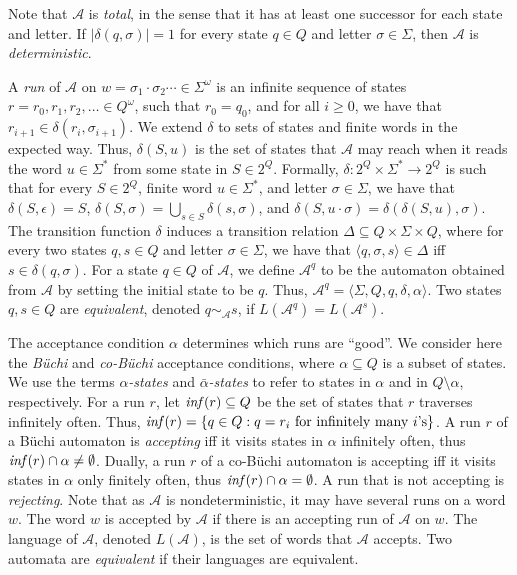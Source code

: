 \documentclass[10pt,a4paper]{amsart}
\theoremstyle{definition}
\numberwithin{equation}{section}
\newcommand{\buchi}{B\"uchi\xspace}
\newcommand{\A}{{\mathcal A}}
\begin{document}
Note that $\A$ is \emph{total}, in the sense that it has at least one successor for each state and letter.
If $|\delta(q, \sigma)| = 1$ for every state $q\in Q$ and letter $\sigma \in \Sigma$, then $\A$ is \emph{deterministic}.


A \emph{run}  of $\A$ on $w = \sigma_1 \cdot \sigma_2 \cdots \in \Sigma^\omega$ is an infinite sequence of states $r = r_0,r_1,r_2,\ldots \in Q^\omega$, such that $r_0 = q_0$, and for all $i \geq 0$, we have that $r_{i+1} \in \delta(r_i, \sigma_{i+1})$. 
We extend $\delta$ to sets of states and finite words in the expected way. Thus, $\delta(S, u)$ is the set of states that $\A$ may reach when it reads the word $u \in \Sigma^*$ from some state in $S \in 2^Q$. Formally, $\delta: 2^Q\times \Sigma^* \to 2^Q$ is such that for every $S \in 2^Q$, finite word $u\in \Sigma^*$, and letter $\sigma\in \Sigma$, we have that $\delta(S, \epsilon) = S$, $\delta(S, \sigma) = \bigcup_{s\in S}\delta(s, \sigma)$, and $\delta(S, u \cdot \sigma) = \delta(\delta(S, u), \sigma)$. 
The transition function $\delta$ induces a transition relation $\Delta \subseteq Q\times \Sigma \times Q$, where for every two states $q,s\in Q$ and letter $\sigma\in \Sigma$, we have that $\langle q, \sigma, s \rangle \in \Delta$ iff $s\in \delta(q, \sigma)$. 
For a state $q\in Q$ of $\A$, we define $\A^q$ to be the automaton obtained from $\A$ by setting the initial state to be $q$. Thus, $\A^q = \langle \Sigma, Q, q, \delta, \alpha \rangle$. Two states $q,s\in Q$ are \emph{equivalent}, denoted $q \sim_{\A} s$, if $L(\A^q) = L(\A^s)$. 

The acceptance condition $\alpha$ determines which runs are ``good''. We consider here the \emph{\buchi} and \emph{co-\buchi} acceptance conditions, where $\alpha \subseteq Q$ is a subset of states. We use the terms {\em $\alpha$-states\/} and  {\em $\bar{\alpha}$-states\/} to refer to states in $\alpha$ and in $Q \setminus \alpha$, respectively. For a run $r$, let ${\it inf}(r)\subseteq Q$ be the set of states that $r$ traverses infinitely often. Thus, 
${\it inf}(r) = \{  q \in Q: q = r_i \text{ for infinitely many $i$'s}   \}$. 
A run $r$ of a \buchi automaton is \emph{accepting} iff it visits states in $\alpha$ infinitely often, thus ${\it inf}(r)\cap \alpha \neq \emptyset$. Dually, a run $r$ of a co-\buchi automaton is accepting iff it visits states in $\alpha$ only finitely often, thus ${\it inf}(r)\cap \alpha = \emptyset$.
A run that is not accepting is \emph{rejecting}.  Note that as $\A$ is nondeterministic, it may have several runs on a word $w$. The word $w$ is accepted by $\A$ if there is an accepting run of $\A$ on $w$. The language of $\A$, denoted $L(\A)$, is the set of words that $\A$ accepts. Two automata are \emph{equivalent} if their languages are equivalent. 
\end{document}
